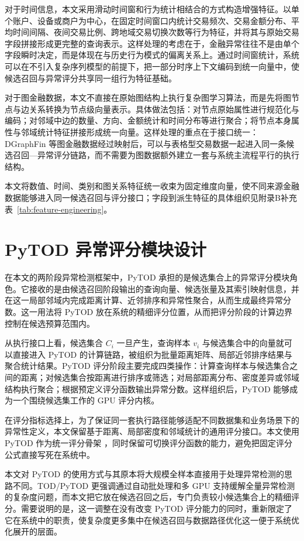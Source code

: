 对于时间信息，本文采用滑动时间窗和行为统计相结合的方式构造增强特征。以单个账户、设备或商户为中心，在固定时间窗口内统计交易频次、交易金额分布、平均时间间隔、夜间交易比例、跨地域交易切换次数等行为特征，并将其与原始交易字段拼接形成更完整的查询表示。这样处理的考虑在于，金融异常往往不是由单个字段瞬时决定，而是体现在与历史行为模式的偏离关系上。通过时间窗统计，系统可以在不引入复杂序列模型的前提下，把一部分时序上下文编码到统一向量中，使候选召回与异常评分共享同一组行为特征基础。

对于图金融数据，本文不直接在原始图结构上执行复杂图学习算法，而是先将图节点与边关系转换为节点级向量表示。具体做法包括：对节点原始属性进行规范化与编码；对邻域中边的数量、方向、金额统计和时间分布等进行聚合；将节点本身属性与邻域统计特征拼接形成统一向量。这样处理的重点在于接口统一：DGraphFin 等图金融数据经过映射后，可以与表格型交易数据一起进入同一条候选召回---异常评分链路，而不需要为图数据额外建立一套与系统主流程平行的执行结构\citep{dgraphfin_paper}。

本文将数值、时间、类别和图关系特征统一收束为固定维度向量，使不同来源金融数据能够进入同一候选召回与评分接口；字段到派生特征的具体组织见附录B补充表~\ref{tab:feature-engineering}。

\FloatBarrier

\section{PyTOD 异常评分模块设计}

在本文的两阶段异常检测框架中，PyTOD 承担的是候选集合上的异常评分模块角色。它接收的是由候选召回阶段输出的查询向量、候选张量及其索引映射信息，并在这一局部邻域内完成距离计算、近邻排序和异常性聚合，从而生成最终异常分数\citep{zhao2022tod}。这一用法将 PyTOD 放在系统的精细评分位置，从而把评分阶段的计算边界控制在候选预算范围内。

从执行接口上看，候选集合 $C_i$ 一旦产生，查询样本 $v_i$ 与候选集合中的向量就可以直接进入 PyTOD 的计算链路，被组织为批量距离矩阵、局部近邻排序结果与聚合统计结果。PyTOD 评分阶段主要完成四类操作：计算查询样本与候选集合之间的距离；对候选集合按距离进行排序或筛选；对局部距离分布、密度差异或邻域结构执行聚合；根据预定义评分函数输出异常分数。这样组织后，PyTOD 能够成为一个围绕候选集工作的 GPU 评分内核。

在评分指标选择上，为了保证同一套执行路径能够适配不同数据集和业务场景下的异常性定义，本文保留基于距离、局部密度和邻域统计的通用评分接口。本文使用 PyTOD 作为统一评分骨架 ，同时保留可切换评分函数的能力，避免把固定评分公式直接写死在系统中。

本文对 PyTOD 的使用方式与其原本将大规模全样本直接用于处理异常检测的思路不同。TOD/PyTOD 更强调通过自动批处理和多 GPU 支持缓解全量异常检测的复杂度问题，而本文把它放在候选召回之后，专门负责较小候选集合上的精细评分。需要说明的是，这一调整在没有改变 PyTOD 评分能力的同时，重新限定了它在系统中的职责，使复杂度更多集中在候选召回与数据路径优化这一便于系统优化展开的层面。

